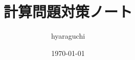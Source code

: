 \documentclass[10pt]{jsarticle}%
\begin{document}
\title{計算問題対策ノート}
\author{hyaraguchi}
\date{\today}
\maketitle



\newpage










\begin{comment}
\newpage

\begin{thebibliography}{1}%
  \bibitem[過去問]{過去問} 公益社団法人 日本アクチュアリー会 資格試験過去問題集 \url{https://www.actuaries.jp/lib/collection/} (最終閲覧日：2023/12/10)
  \bibitem[教科書]{教科書} 日本アクチュアリー会『損保数理』(日本アクチュアリー会, 2011)
  \bibitem[モデリング]{モデリング} 日本アクチュアリー会『モデリング』(日本アクチュアリー会, 2005)
  \bibitem[リスク・セオリー]{リスク・セオリー} 岩沢宏和『リスク・セオリーの基礎』(培風館, 2010)
  \bibitem[アク数学シリーズ]{アク数学シリーズ} 岩沢宏和, 黒田耕嗣『アクチュアリー数学シリーズ4 損害保険数理』(日本評論社, 2015)
  \bibitem[ストラテジー]{ストラテジー} MAH, 平井卓也, 玉岡一史『アクチュアリー試験 合格へのストラテジー 損保数理』(東京図書, 2019)
  \bibitem[例題で学ぶ]{例題で学ぶ} 小暮雅一, 東出純『例題で学ぶ損害保険数理 第2版』(共立出版, 2016)
  \bibitem[難問題の系統]{難問題の系統}CAR他「難問題の系統とその解き方 損保数理」\url{}(最終閲覧日：2023/12/10)
  \bibitem[弱点克服]{弱点克服} 藤田岳彦『弱点克服 大学生の確率・統計』(東京図書, 2010)
  \bibitem[数研微積分]{数研微積分} 加藤文元『大学教養 微分積分』(数研出版, 2019)
\end{thebibliography}
\end{comment}
\end{document}
